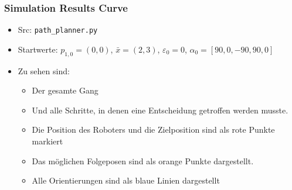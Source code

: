 \documentclass[10pt,a4paper]{article}
\begin{document}
\subsubsection{Simulation Results Curve}

\begin{itemize}
	\item Src: \texttt{path\_planner.py}
	
	\item Startwerte: $p_{1,0} = (0,0)$, $\bar{x} = (2,3)$, $\varepsilon_0 = 0$, $\alpha_0 = [90,0,-90,90,0]$
	
	\item Zu sehen sind:
	\begin{itemize}
		\item Der gesamte Gang
		\item Und alle Schritte, in denen eine Entscheidung getroffen werden musste.
		\item Die Position des Roboters und die Zielposition sind als rote Punkte markiert
		\item Das möglichen Folgeposen sind als orange Punkte dargestellt.
		\item Alle Orientierungen sind als blaue Linien dargestellt
	\end{itemize}

\end{itemize}
\end{document}
